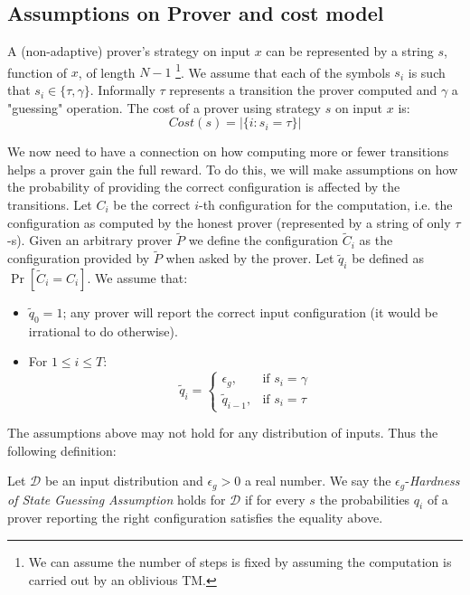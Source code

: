 
\subsection{Assumptions on Prover and cost model}


A (non-adaptive) prover's strategy on input $x$ can be represented by a string $s$, function of $x$, of length $N-1$ \footnote{We can assume the number of steps is fixed by assuming the computation is carried out by an oblivious TM.}.
We assume that each of the symbols $s_i$ is such that $s_i \in \{ \tau, \gamma \}$. Informally $\tau$ represents a transition the prover computed and $\gamma$ a "guessing" operation.
The cost of a prover using strategy $s$ on input $x$ is:
$$ Cost(s) = |\{ i : s_i = \tau \}| $$

We now need to have a connection on how computing more or fewer transitions helps a prover gain the full reward. 
To do this, we will make assumptions on how the probability of providing the correct configuration is affected by the transitions.
Let $C_i$ be the correct $i$-th configuration for the computation, i.e.  the configuration as computed by the honest prover (represented by a string of only $\tau$-s). Given an arbitrary prover $\tilde{P}$ we define the configuration $\tilde{C}_i$ as the configuration provided by $\tilde{P}$ when asked by the prover.
\newcommand{\pCorrConf}{\tilde{q}}
\newcommand{\pGuessing}{\epsilon_g}
Let $\pCorrConf_i$ be defined as $\Pr[\tilde{C}_i = C_i]$.
We assume that:
\begin{itemize}
\item $\pCorrConf_0 = 1$; any prover will report the correct input configuration (it would be irrational to do otherwise).
\item For $1 \leq i \leq T$:
\[
    \pCorrConf_i = \left\{\begin{array}{lr}
        \pGuessing, & \text{if } s_i = \gamma \\
        \pCorrConf_{i-1}, & \text{if } s_i = \tau 
        \end{array}
  \]
\end{itemize}

The assumptions above may not hold for any distribution of inputs. Thus the following definition:
\begin{definition}
Let $\mathcal{D}$ be an input distribution and $\epsilon_g > 0$ a real number. We say the $\epsilon_g$-\emph{Hardness of State Guessing Assumption} holds for $\mathcal{D}$ if for every $s$ the probabilities $q_i$ of a prover reporting the right configuration satisfies the equality above.
\end{definition}


